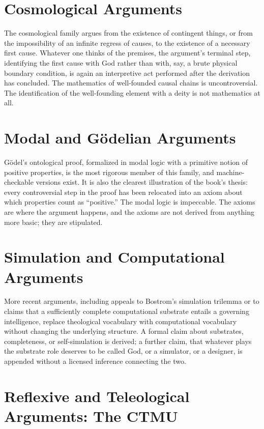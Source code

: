 \documentclass[11pt]{book}
\begin{document}
\section{Cosmological Arguments}

The cosmological family argues from the existence of contingent things, or from the impossibility of an infinite regress of causes, to the existence of a necessary first cause. Whatever one thinks of the premises, the argument's terminal step, identifying the first cause with God rather than with, say, a brute physical boundary condition, is again an interpretive act performed after the derivation has concluded. The mathematics of well-founded causal chains is uncontroversial. The identification of the well-founding element with a deity is not mathematics at all.

\section{Modal and Gödelian Arguments}

Gödel's ontological proof, formalized in modal logic with a primitive notion of positive properties, is the most rigorous member of this family, and machine-checkable versions exist. It is also the clearest illustration of the book's thesis: every controversial step in the proof has been relocated into an axiom about which properties count as ``positive.'' The modal logic is impeccable. The axioms are where the argument happens, and the axioms are not derived from anything more basic; they are stipulated.

\section{Simulation and Computational Arguments}

More recent arguments, including appeals to Bostrom's simulation trilemma or to claims that a sufficiently complete computational substrate entails a governing intelligence, replace theological vocabulary with computational vocabulary without changing the underlying structure. A formal claim about substrates, completeness, or self-simulation is derived; a further claim, that whatever plays the substrate role deserves to be called God, or a simulator, or a designer, is appended without a licensed inference connecting the two.

\section{Reflexive and Teleological Arguments: The CTMU}
\end{document}
